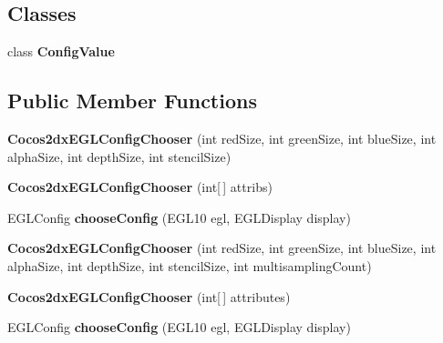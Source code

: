 \subsection*{Classes}
\begin{DoxyCompactItemize}
\item 
class {\bfseries Config\+Value}
\end{DoxyCompactItemize}
\subsection*{Public Member Functions}
\begin{DoxyCompactItemize}
\item 
\mbox{\label{classorg_1_1cocos2dx_1_1lib_1_1Cocos2dxActivity_1_1Cocos2dxEGLConfigChooser_aedbb60df311902f0af6d00e234c9329d}} 
{\bfseries Cocos2dx\+E\+G\+L\+Config\+Chooser} (int red\+Size, int green\+Size, int blue\+Size, int alpha\+Size, int depth\+Size, int stencil\+Size)
\item 
\mbox{\label{classorg_1_1cocos2dx_1_1lib_1_1Cocos2dxActivity_1_1Cocos2dxEGLConfigChooser_a06b5359cbfe60b7caef043d3f0217a8c}} 
{\bfseries Cocos2dx\+E\+G\+L\+Config\+Chooser} (int\mbox{[}$\,$\mbox{]} attribs)
\item 
\mbox{\label{classorg_1_1cocos2dx_1_1lib_1_1Cocos2dxActivity_1_1Cocos2dxEGLConfigChooser_a20cbb4f674ea42ece7d2777246114440}} 
E\+G\+L\+Config {\bfseries choose\+Config} (E\+G\+L10 egl, E\+G\+L\+Display display)
\item 
\mbox{\label{classorg_1_1cocos2dx_1_1lib_1_1Cocos2dxActivity_1_1Cocos2dxEGLConfigChooser_ae4525912dbb9d6deb11329d4b87a51e0}} 
{\bfseries Cocos2dx\+E\+G\+L\+Config\+Chooser} (int red\+Size, int green\+Size, int blue\+Size, int alpha\+Size, int depth\+Size, int stencil\+Size, int multisampling\+Count)
\item 
\mbox{\label{classorg_1_1cocos2dx_1_1lib_1_1Cocos2dxActivity_1_1Cocos2dxEGLConfigChooser_a1d19789c6b61fdd6a7985c084426f5e7}} 
{\bfseries Cocos2dx\+E\+G\+L\+Config\+Chooser} (int\mbox{[}$\,$\mbox{]} attributes)
\item 
\mbox{\label{classorg_1_1cocos2dx_1_1lib_1_1Cocos2dxActivity_1_1Cocos2dxEGLConfigChooser_a20cbb4f674ea42ece7d2777246114440}} 
E\+G\+L\+Config {\bfseries choose\+Config} (E\+G\+L10 egl, E\+G\+L\+Display display)
\end{DoxyCompactItemize}

